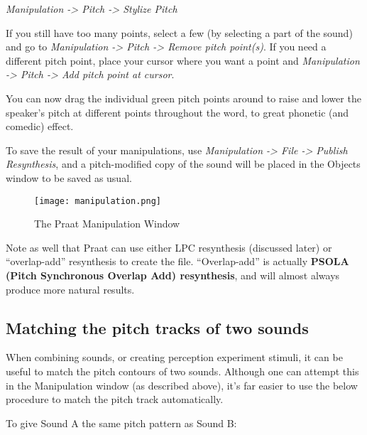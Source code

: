 \emph{Manipulation -\textgreater{} Pitch -\textgreater{} Stylize Pitch}

If you still have too many points, select a few (by selecting a part of
the sound) and go to \emph{Manipulation -\textgreater{} Pitch
-\textgreater{} Remove pitch point(s)}. If you need a different pitch
point, place your cursor where you want a point and \emph{Manipulation
-\textgreater{} Pitch -\textgreater{} Add pitch point at cursor}.

You can now drag the individual green pitch points around to raise and
lower the speaker's pitch at different points throughout the word, to
great phonetic (and comedic) effect.

To save the result of your manipulations, use \emph{Manipulation
-\textgreater{} File -\textgreater{} Publish Resynthesis}, and a
pitch-modified copy of the sound will be placed in the Objects window to
be saved as usual.

\begin{figure}
  \centerline{
    \mbox{\texttt{[image: manipulation.png]}}
  }
  \caption{The Praat Manipulation Window\label{manipulation}}

  \end{figure}

Note as well that Praat can use either LPC resynthesis (discussed later)
or ``overlap-add'' resynthesis to create the file. ``Overlap-add'' is
actually \textbf{PSOLA (Pitch Synchronous Overlap Add) resynthesis}, and
will almost always produce more natural results.

\hypertarget{matching-the-pitch-tracks-of-two-sounds}{%
\subsection{Matching the pitch tracks of two
sounds}\label{matching-the-pitch-tracks-of-two-sounds}}

When combining sounds, or creating perception experiment stimuli, it can
be useful to match the pitch contours of two sounds. Although one can
attempt this in the Manipulation window (as described above), it's far
easier to use the below procedure to match the pitch track
automatically.

To give Sound A the same pitch pattern as Sound B:

